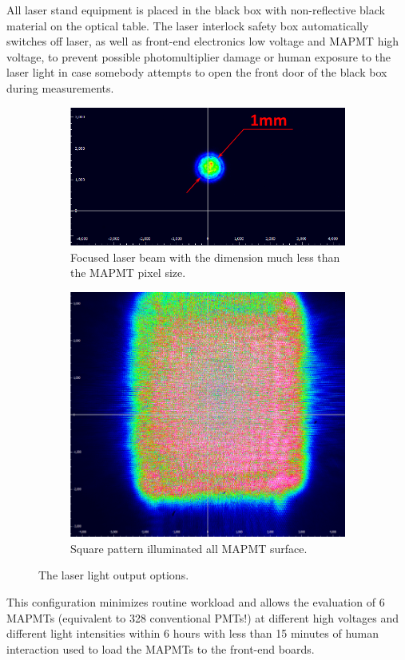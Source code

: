 All laser stand equipment is placed in the black box with non-reflective black material on the optical table. The laser interlock safety box automatically switches off laser, as well as front-end electronics low voltage and MAPMT high voltage, to prevent possible photomultiplier damage or human exposure to the laser light in case somebody attempts to open the front door of the black box during measurements.

\begin{figure}[bt]
	\centering
	\begin{subfigure}[b]{0.628\linewidth}
		\includegraphics[width=\linewidth]{figures/beamspot.pdf}
		\caption{Focused laser beam with the dimension much less than the  MAPMT pixel size.}
		\label{fig:beamopt1}
	\end{subfigure}
	\begin{subfigure}[b]{0.354\linewidth}
		\includegraphics[width=\linewidth]{figures/beamsquare.pdf}
		\caption{Square pattern illuminated all MAPMT surface.}
		\label{fig:beamopt2}
	\end{subfigure}
	\caption{The laser light output options.}
\end{figure}

This configuration minimizes routine workload and allows the evaluation of 6 MAPMTs (equivalent to 328 conventional PMTs!) at different high voltages and different light intensities within 6 hours with less than 15 minutes of human interaction used to load the MAPMTs to the front-end boards.

